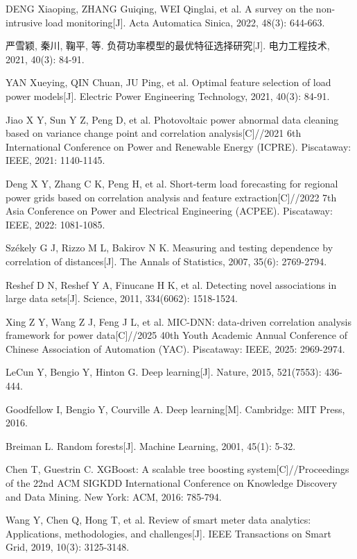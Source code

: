 DENG Xiaoping, ZHANG Guiqing, WEI Qinglai, et al. A survey on the non-intrusive load monitoring[J]. Acta Automatica Sinica, 2022, 48(3): 644-663.

严雪颖, 秦川, 鞠平, 等. 负荷功率模型的最优特征选择研究[J]. 电力工程技术, 2021, 40(3): 84-91.

YAN Xueying, QIN Chuan, JU Ping, et al. Optimal feature selection of load power models[J]. Electric Power Engineering Technology, 2021, 40(3): 84-91.

Jiao X Y, Sun Y Z, Peng D, et al. Photovoltaic power abnormal data cleaning based on variance change point and correlation analysis[C]//2021 6th International Conference on Power and Renewable Energy (ICPRE). Piscataway: IEEE, 2021: 1140-1145.

Deng X Y, Zhang C K, Peng H, et al. Short-term load forecasting for regional power grids based on correlation analysis and feature extraction[C]//2022 7th Asia Conference on Power and Electrical Engineering (ACPEE). Piscataway: IEEE, 2022: 1081-1085.

Székely G J, Rizzo M L, Bakirov N K. Measuring and testing dependence by correlation of distances[J]. The Annals of Statistics, 2007, 35(6): 2769-2794.

Reshef D N, Reshef Y A, Finucane H K, et al. Detecting novel associations in large data sets[J]. Science, 2011, 334(6062): 1518-1524.

Xing Z Y, Wang Z J, Feng J L, et al. MIC-DNN: data-driven correlation analysis framework for power data[C]//2025 40th Youth Academic Annual Conference of Chinese Association of Automation (YAC). Piscataway: IEEE, 2025: 2969-2974.

LeCun Y, Bengio Y, Hinton G. Deep learning[J]. Nature, 2015, 521(7553): 436-444.

Goodfellow I, Bengio Y, Courville A. Deep learning[M]. Cambridge: MIT Press, 2016.

Breiman L. Random forests[J]. Machine Learning, 2001, 45(1): 5-32.

Chen T, Guestrin C. XGBoost: A scalable tree boosting system[C]//Proceedings of the 22nd ACM SIGKDD International Conference on Knowledge Discovery and Data Mining. New York: ACM, 2016: 785-794.

Wang Y, Chen Q, Hong T, et al. Review of smart meter data analytics: Applications, methodologies, and challenges[J]. IEEE Transactions on Smart Grid, 2019, 10(3): 3125-3148.

